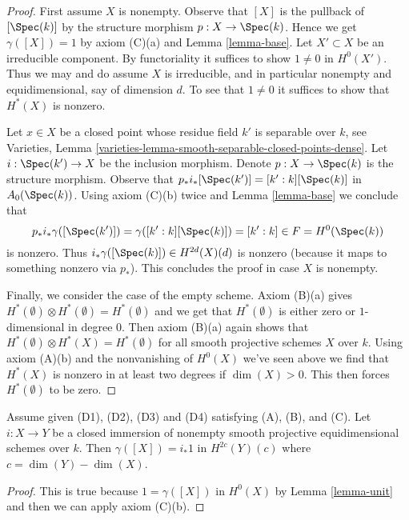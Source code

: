 \begin{proof}
First assume $X$ is nonempty.
Observe that $[X]$ is the pullback of $[\Spec(k)]$ by the structure morphism
$p : X \to \Spec(k)$. Hence we get $\gamma([X]) = 1$ by axiom (C)(a)
and Lemma \ref{lemma-base}. Let $X' \subset X$ be an irreducible component.
By functoriality it suffices to show $1 \not = 0$ in $H^0(X')$.
Thus we may and do assume $X$ is irreducible, and in particular
nonempty and equidimensional, say of dimension $d$.
To see that $1 \not = 0$ it suffices to show that $H^*(X)$ is nonzero.

\medskip\noindent
Let $x \in X$ be a closed point whose residue field $k'$
is separable over $k$, see
Varieties, Lemma \ref{varieties-lemma-smooth-separable-closed-points-dense}.
Let $i : \Spec(k') \to X$ be the inclusion morphism.
Denote  $p : X \to \Spec(k)$ is the structure morphism.
Observe that
$p_*i_*[\Spec(k')] = [k' : k][\Spec(k)]$ in $A_0(\Spec(k))$.
Using axiom (C)(b) twice and Lemma \ref{lemma-base}
we conclude that
$$
p_*i_*\gamma([\Spec(k')]) = \gamma([k' : k][\Spec(k)]) = [k' : k]
\in F = H^0(\Spec(k))
$$
is nonzero. Thus $i_*\gamma([\Spec(k)]) \in H^{2d}(X)(d)$ is nonzero
(because it maps to something nonzero via $p_*$). This concludes the proof
in case $X$ is nonempty.

\medskip\noindent
Finally, we consider the case of the empty scheme. Axiom (B)(a) gives
$H^*(\emptyset) \otimes H^*(\emptyset) = H^*(\emptyset)$ and
we get that $H^*(\emptyset)$ is either zero or $1$-dimensional
in degree $0$. Then axiom (B)(a) again shows that
$H^*(\emptyset) \otimes H^*(X) = H^*(\emptyset)$ for
all smooth projective schemes $X$ over $k$. Using axiom (A)(b)
and the nonvanishing of $H^0(X)$ we've seen above
we find that $H^*(X)$ is nonzero in at least two degrees
if $\dim(X) > 0$. This then forces $H^*(\emptyset)$ to be zero.
\end{proof}

\begin{lemma}
\label{lemma-push-unit}
Assume given (D1), (D2), (D3) and (D4) satisfying (A), (B), and (C).
Let $i : X \to Y$ be a closed immersion of nonempty smooth projective
equidimensional schemes over $k$. Then
$\gamma([X]) = i_*1$ in $H^{2c}(Y)(c)$ where $c = \dim(Y) - \dim(X)$.
\end{lemma}

\begin{proof}
This is true because $1 = \gamma([X])$ in $H^0(X)$ by Lemma \ref{lemma-unit}
and then we can apply axiom (C)(b).
\end{proof}

